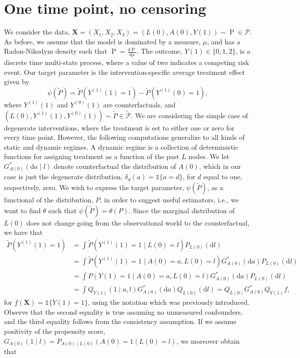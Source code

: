 \documentclass{article}
\newcommand{\A}[1]{A(#1)}
\renewcommand{\L}[1]{L(#1)}
\newcommand{\Y}[1]{Y(#1)}
\newcommand{\Ystar}[2]{Y^{(#1)}(#2)}
\renewcommand{\P}{\ensuremath{\operatorname{P}}}
\renewcommand{\d}{\ensuremath{\mathrm{d}}}
\begin{document}
\section{One time point, no censoring}
We consider the data, $\textbf{X}=(X_1,X_2,X_3)=(\L{0},\A{0},\Y{1})\sim \P\in\mathcal{P}$. As before, we assume that the model is dominated by a measure, \(\mu\), and has a Radon-Niko\d ym density such that $\P=\frac{d\P}{d\mu}$. The outcome, $Y(1)\in\{0,1,2\}$, is a discrete time multi-state process, where a value of two indicates a competing risk event. 
Our target parameter is the intervention-specific average treatment effect given by
$$\psi(\tilde{P})=\tilde{P}(\Ystar{1}{1}=1)-\tilde{P}(\Ystar{1}{0}=1),$$
where $\Ystar{1}{1}$ and $\Ystar{0}{1}$ are counterfactuals, and $(\L{0},\Ystar{1}{1},\Ystar{0}{1})\sim\tilde{P}\in\tilde{\mathcal{P}}$. We are considering the simple case of degenerate interventions, where the treatment is set to either one or zero for every time point. However, the following computations generalize to all kinds of static and \d ynamic regimes. A \d ynamic regime is a collection of deterministic functions for assigning treatment as a function of the past $L$ nodes. We let $G^*_{\A{0}}(\d a\mid l)$ denote counterfactual the distribution of $\A{0}$, which in our case is just the degenerate distribution, $\delta_d(a)=\mathds{1}\{a=d\}$, for $d$ equal to one, respectively, zero. We wish to express the target parameter, $\psi(\tilde{P})$, as a functional of the distribution, $P$, in order to suggest useful estimators, i.e., we want to find $\theta$ such that $\psi(\tilde{P})=\theta(P)$. Since the marginal distribution of $\L{0}$ does not change going from the observational world to the counterfactual, we have that
\begin{align*}
    \tilde{P}(\Ystar{1}{1}=1)&=\int\tilde{P}(\Ystar{1}{1}=1\mid \L{0}=l)P_{\L{0}}(\d l)\\
    &=\int\tilde{P}(\Ystar{1}{1}=1\mid \A{0}=a,\L{0}=l)G^*_{\A{0}}(\d a)P_{\L{0}}(\d l)\\
    &=\int P(\Y{1}=1\mid \A{0}=a,\L{0}=l)G^*_{\A{0}}(\d a)P_{\L{0}}(\d l)\\
    &=\int Q_{\Y{1}}(1\mid a,l)G^*_{\A{0}}(\d a)Q_{\L{0}}(\d l)=Q_{\L{0}}G^*_{\A{0}}Q_{\Y{1}}f,
\end{align*}
for $f(\textbf{X})=\mathds{1}\{\Y{1}=1\}$, using the notation which was previously introduced. Observe that the second equality is true assuming no unmeasured confounders, and the third equality follows from the consistency assumption. If we assume positivity of the propensity score, $G_{\A{0}}(1\mid l)=P_{\A{0}\mid \L{0}}(\A{0}=1\mid \L{0}=l)$, we moreover obtain that
\end{document}
